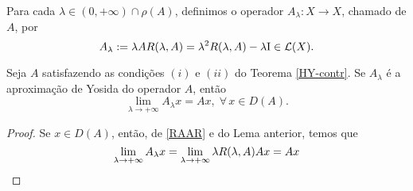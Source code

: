 \begin{definition}
Para cada $\lambda \in (0,+\infty) \cap \rho(A)$, definimos o operador $A_\lambda: X\longrightarrow X$, chamado  de $A$, por 
\begin{equation*}
A_\lambda :=\lambda AR(\lambda,A) =\lambda^2R(\lambda,A) -\lambda \operatorname{\!I}\in \mathcal{L}(X).
\end{equation*}
\end{definition}

\begin{lemma}
 Seja $A$ satisfazendo as condições $(i)$ e $(ii)$ do Teorema \ref{HY-contr}. 
Se $A_\lambda$ é a aproximação de Yosida do operador $A$, então
\begin{equation*}
\lim_{\lambda \to +\infty}A_\lambda x=Ax,\; \forall\, x\in D(A).
\end{equation*}
\end{lemma}
\begin{proof}
Se $x\in D(A)$, então, de \eqref{RAAR} e do Lema anterior, temos que
\begin{equation*}
\lim_{\lambda \to +\infty}A_\lambda x=\lim_{\lambda \to +\infty}\lambda R(\lambda,A) Ax=Ax
\end{equation*}
\end{proof}

